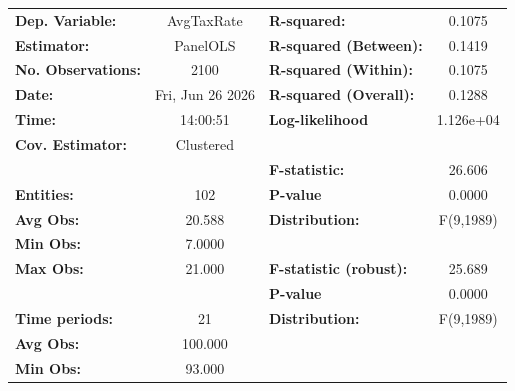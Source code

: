\begin{center}
\begin{tabular}{lclc}
\toprule
\textbf{Dep. Variable:}                            &     AvgTaxRate     & \textbf{  R-squared:         }   &      0.1075      \\
\textbf{Estimator:}                                &      PanelOLS      & \textbf{  R-squared (Between):}  &      0.1419      \\
\textbf{No. Observations:}                         &        2100        & \textbf{  R-squared (Within):}   &      0.1075      \\
\textbf{Date:}                                     &  Fri, Jun 26 2026  & \textbf{  R-squared (Overall):}  &      0.1288      \\
\textbf{Time:}                                     &      14:00:51      & \textbf{  Log-likelihood     }   &    1.126e+04     \\
\textbf{Cov. Estimator:}                           &     Clustered      & \textbf{                     }   &                  \\
\textbf{}                                          &                    & \textbf{  F-statistic:       }   &      26.606      \\
\textbf{Entities:}                                 &        102         & \textbf{  P-value            }   &      0.0000      \\
\textbf{Avg Obs:}                                  &       20.588       & \textbf{  Distribution:      }   &    F(9,1989)     \\
\textbf{Min Obs:}                                  &       7.0000       & \textbf{                     }   &                  \\
\textbf{Max Obs:}                                  &       21.000       & \textbf{  F-statistic (robust):} &      25.689      \\
\textbf{}                                          &                    & \textbf{  P-value            }   &      0.0000      \\
\textbf{Time periods:}                             &         21         & \textbf{  Distribution:      }   &    F(9,1989)     \\
\textbf{Avg Obs:}                                  &      100.000       & \textbf{                     }   &                  \\
\textbf{Min Obs:}                                  &       93.000       & \textbf{                     }   &                  \\

\end{tabular}
\end{center}
